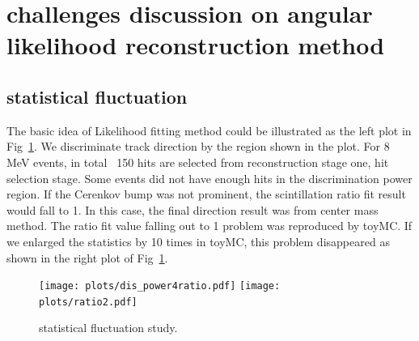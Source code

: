 \documentclass[a4paper,10pt]{cpc-hepnp}
\begin{document}
\section{challenges discussion on angular likelihood reconstruction method}
\subsection{statistical fluctuation}
The basic idea of Likelihood fitting method could be illustrated as the left plot
in Fig~\ref{dis_power}. We discriminate track direction by the region shown in
the plot. For 8 MeV events, in total ~150 hits are selected from reconstruction
stage one, hit selection stage. Some events did not have enough hits in the
discrimination power region. If the Cerenkov bump was not prominent,
the scintillation ratio fit result would fall to 1. In this case, the final
direction result was from center mass method. The ratio fit value falling
out to 1 problem  was reproduced by toyMC. If we enlarged the statistics by
10 times in toyMC, this problem disappeared as shown in the right plot of
Fig~\ref{dis_power}. 
\begin{figure}[htbp]
\centering %
\texttt{[image: plots/dis\_power4ratio.pdf]}
\texttt{[image: plots/ratio2.pdf]}
\caption{\label{dis_power} statistical fluctuation study.}
\end{figure}
\end{document}
